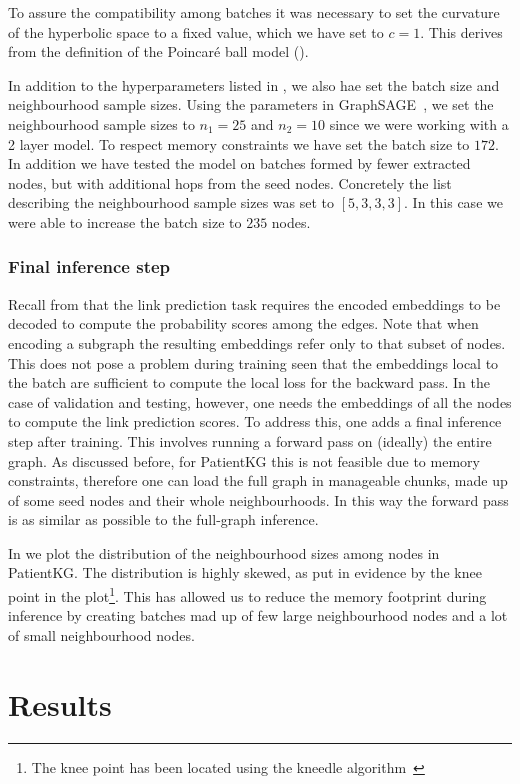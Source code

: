 To assure the compatibility among batches it was necessary to set the curvature of the hyperbolic space to a fixed value, which we have set to $c=1$. This derives from the definition of the Poincaré ball model ().

\medskip 

In addition to the hyperparameters listed in , we also hae set the batch size and neighbourhood sample sizes. Using the parameters in GraphSAGE~\cite{Hamilton2017inductiveRepresentationLearning}, we set the neighbourhood sample sizes to $n_1=25$ and $n_2=10$ since we were working with a 2 layer model. To respect memory constraints we have set the batch size to $172$. In addition we have tested the model on batches formed by fewer extracted nodes, but with additional hops from the seed nodes. Concretely the list describing the neighbourhood sample sizes was set to $[5,3,3,3]$. In this case we were able to increase the batch size to $235$ nodes.

\subsubsection{Final inference step}
Recall from  that the link prediction task requires the encoded embeddings to be decoded to compute the probability scores among the edges. Note that when encoding a subgraph the resulting embeddings refer only to that subset of nodes. This does not pose a problem during training seen that the embeddings local to the batch are sufficient to compute the local loss for the backward pass. In the case of validation and testing, however, one needs the embeddings of all the nodes to compute the link prediction scores. To address this, one adds a final inference step after training. This involves running a forward pass on (ideally) the entire graph. As discussed before, for PatientKG this is not feasible due to memory constraints, therefore one can load the full graph in manageable chunks, made up of some seed nodes and their whole neighbourhoods. In this way the forward pass is as similar as possible to the full-graph inference. 

In  we plot the distribution of the neighbourhood sizes among nodes in PatientKG. The distribution is highly skewed, as put in evidence by the knee point in the plot\footnote{The knee point has been located using the kneedle algorithm~\cite{satopaa2011KneePointDetection}}. This has allowed us to reduce the memory footprint during inference by creating batches mad up of few large neighbourhood nodes and a lot of small neighbourhood nodes. 





\section{Results}


